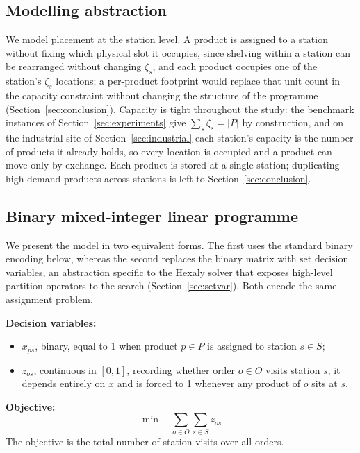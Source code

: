 \documentclass[]{interact}
\begin{document}
\subsection{Modelling abstraction}\label{sec:abstraction}
We model placement at the station level. A product is assigned to a station without fixing which physical slot it occupies, since shelving within a station can be rearranged without changing $\zeta_s$, and each product occupies one of the station's $\zeta_s$ locations; a per-product footprint would replace that unit count in the capacity constraint without changing the structure of the programme (Section~\ref{sec:conclusion}). Capacity is tight throughout the study: the benchmark instances of Section~\ref{sec:experiments} give $\sum_{s} \zeta_s = |P|$ by construction, and on the industrial site of Section~\ref{sec:industrial} each station's capacity is the number of products it already holds, so every location is occupied and a product can move only by exchange. Each product is stored at a single station; duplicating high-demand products across stations is left to Section~\ref{sec:conclusion}.

\subsection{Binary mixed-integer linear programme}\label{sec:milp}
We present the model in two equivalent forms. The first uses the standard binary encoding below, whereas the second replaces the binary matrix with set decision variables, an abstraction specific to the Hexaly solver \citep{blaisemodeling} that exposes high-level partition operators to the search (Section~\ref{sec:setvar}). Both encode the same assignment problem.

\noindent\textbf{Decision variables:}
\begin{itemize}
\item $x_{ps}$, binary, equal to 1 when product $p \in P$ is assigned to station $s \in S$;
\item $z_{os}$, continuous in $[0,1]$, recording whether order $o \in O$ visits station $s$; it depends entirely on $x$ and is forced to 1 whenever any product of $o$ sits at $s$.
\end{itemize}

\noindent\textbf{Objective:}
\begin{equation}
\min \quad \sum_{o \in O} \sum_{s \in S} z_{os} \label{eq:obj}
\end{equation}
The objective is the total number of station visits over all orders.
\end{document}
